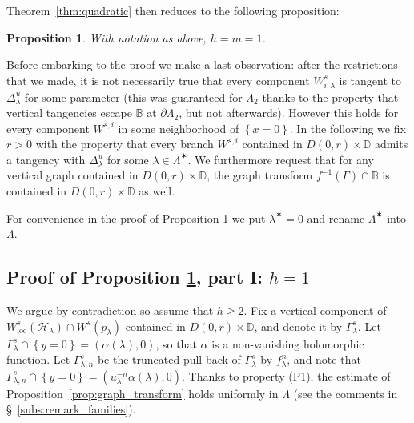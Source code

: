 \documentclass[11pt, oneside]{amsart}
\newcommand{\B}{\mathbb{B}}
\newcommand{\D}{\mathbb{D}}
\newcommand{\fr}{\partial}
\newcommand{\set}[1]{\left\{#1\right\}}
\newcommand{\norm}[1]{\left\Vert#1\right\Vert}
\newcommand{\loc}{{\mathrm{loc}}}
\newcommand{\inv}{^{-1}}
\newtheorem{prop}{Proposition} [section]
\theoremstyle{remark}
\theoremstyle{definition}
\theoremstyle{theorem}
\newcommand{\romain}[1]{{\color{red}*}\marginpar{\tiny  \color{red} RD: #1}}
\begin{document}
 Theorem~\ref{thm:quadratic} then reduces to the following proposition:
  
\begin{prop}\label{prop:main}
With notation as above, $h = m=1$.   
\end{prop}
 
%
%

 Before embarking to the proof we make a last observation: after the restrictions that we made, it is not necessarily 
true that   every component   $W^s_{i, \lambda}$ is tangent to  $\Delta^u_\lambda$ for some parameter (this was guaranteed for  $\Lambda_2$ thanks to the property that vertical tangencies escape $\B$ 
at $\fr\Lambda_2$, but not afterwards). However this holds for every 
 component $W^{s,i}$ in some neighborhood of $\set{x=0}$. In the following 
 we fix $r>0$ with the property  that every 
 branch $W^{s,i}$ contained in $D(0,r)\times \D$ admits a tangency with $\Delta^u_\lambda$ for some $\lambda\in \Lambda^\varstar$. We  furthermore request that  for any vertical 
 graph contained in $D(0,r)\times \D$,  the  graph transform  $f\inv(\Gamma)\cap \B$ is contained in 
 $D(0,r)\times \D$ as well. 
  
 
 For convenience in the proof of Proposition \ref{prop:main} we put $\lambda^\varstar = 0$ 
and rename $\Lambda^\varstar$ into $\Lambda$. 


\subsection{Proof of Proposition \ref{prop:main},   part I: $h=1$} \label{subs:proof_part1}
We argue by contradiction so assume that $h\geq 2$. 
Fix a vertical component of 
$  W^s_\loc(\mathcal H_\lambda)\cap W^s(p_\lambda)$ contained in $D(0,r)\times \D$, and denote it by 
$\Gamma^s_\lambda$.
 Let $\Gamma^s_\lambda\cap \set{y=0} =  (\alpha(\lambda), 0)$, 
 so that $\alpha$ is a non-vanishing holomorphic function.
 Let $\Gamma^s_{\lambda, n}$  be the truncated pull-back
of $\Gamma^s_\lambda$ by $f_\lambda^n$, and note that 
$\Gamma^s_{\lambda, n}\cap \set{y=0} =  (u_\lambda^{-n} \alpha(\lambda), 0)$. Thanks to 
 property (P1), the estimate of Proposition~\ref{prop:graph_transform} holds uniformly in $\Lambda$ (see   
the comments in \S~\ref{subs:remark_families}).
\end{document}
